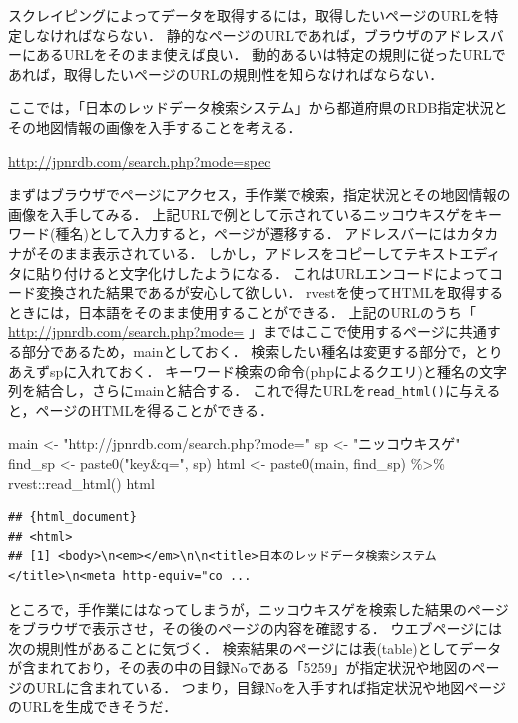\documentclass[
]{article}
\newenvironment{Shaded}{\begin{snugshade}}{\end{snugshade}}
\newcommand{\FunctionTok}[1]{\textcolor[rgb]{0.00,0.00,0.00}{#1}}
\newcommand{\NormalTok}[1]{#1}
\newcommand{\OtherTok}[1]{\textcolor[rgb]{0.56,0.35,0.01}{#1}}
\newcommand{\SpecialCharTok}[1]{\textcolor[rgb]{0.00,0.00,0.00}{#1}}
\newcommand{\StringTok}[1]{\textcolor[rgb]{0.31,0.60,0.02}{#1}}
\begin{document}
スクレイピングによってデータを取得するには，取得したいページのURLを特定しなければならない．
静的なページのURLであれば，ブラウザのアドレスバーにあるURLをそのまま使えば良い．
動的あるいは特定の規則に従ったURLであれば，取得したいページのURLの規則性を知らなければならない．

ここでは，「日本のレッドデータ検索システム」から都道府県のRDB指定状況とその地図情報の画像を入手することを考える．

\url{http://jpnrdb.com/search.php?mode=spec}

まずはブラウザでページにアクセス，手作業で検索，指定状況とその地図情報の画像を入手してみる．
上記URLで例として示されているニッコウキスゲをキーワード(種名)として入力すると，ページが遷移する．
アドレスバーにはカタカナがそのまま表示されている．
しかし，アドレスをコピーしてテキストエディタに貼り付けると文字化けしたようになる．
これはURLエンコードによってコード変換された結果であるが安心して欲しい．
rvestを使ってHTMLを取得するときには，日本語をそのまま使用することができる．
上記のURLのうち「 \url{http://jpnrdb.com/search.php?mode=} 」まではここで使用するページに共通する部分であるため，mainとしておく．
検索したい種名は変更する部分で，とりあえずspに入れておく．
キーワード検索の命令(phpによるクエリ)と種名の文字列を結合し，さらにmainと結合する．
これで得たURLを\texttt{read\_html()}に与えると，ページのHTMLを得ることができる．

\begin{Shaded}
\begin{Highlighting}[]
\NormalTok{main }\OtherTok{\textless{}{-}} \StringTok{"http://jpnrdb.com/search.php?mode="}
\NormalTok{sp }\OtherTok{\textless{}{-}} \StringTok{"ニッコウキスゲ"}
\NormalTok{find\_sp }\OtherTok{\textless{}{-}} \FunctionTok{paste0}\NormalTok{(}\StringTok{"key\&q="}\NormalTok{, sp)}
\NormalTok{html }\OtherTok{\textless{}{-}} 
  \FunctionTok{paste0}\NormalTok{(main, find\_sp) }\SpecialCharTok{\%\textgreater{}\%}
\NormalTok{  rvest}\SpecialCharTok{::}\FunctionTok{read\_html}\NormalTok{()}
\NormalTok{html}
\end{Highlighting}
\end{Shaded}

\begin{verbatim}
## {html_document}
## <html>
## [1] <body>\n<em></em>\n\n<title>日本のレッドデータ検索システム</title>\n<meta http-equiv="co ...
\end{verbatim}

ところで，手作業にはなってしまうが，ニッコウキスゲを検索した結果のページをブラウザで表示させ，その後のページの内容を確認する．
ウエブページには次の規則性があることに気づく．
検索結果のページには表(table)としてデータが含まれており，その表の中の目録Noである「5259」が指定状況や地図のページのURLに含まれている．
つまり，目録Noを入手すれば指定状況や地図ページのURLを生成できそうだ．
\end{document}
